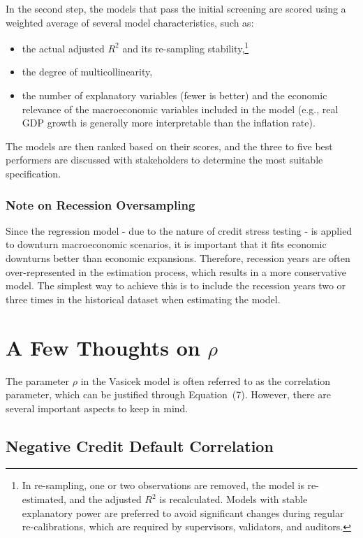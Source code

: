 \documentclass[11pt,a4paper]{article}
\begin{document}
In the second step, the models that pass the initial screening are scored using a weighted average of several model characteristics, such as:
\begin{itemize}
\item the actual adjusted $R^2$ and its re-sampling stability,\footnote{In re-sampling, one or two observations are removed, the model is re-estimated, and the adjusted $R^2$ is recalculated. Models with stable explanatory power are preferred to avoid significant changes during regular re-calibrations, which are required by supervisors, validators, and auditors.}
\item the degree of multicollinearity,
\item the number of explanatory variables (fewer is better) and the economic relevance of the macroeconomic variables included in the model (e.g., real GDP growth is generally more interpretable than the inflation rate).
\end{itemize}
The models are then ranked based on their scores, and the three to five best performers are discussed with stakeholders to determine the most suitable specification.

\subsubsection{Note on Recession Oversampling}

Since the regression model - due to the nature of credit stress testing - is applied to downturn macroeconomic scenarios, it is important that it fits economic downturns better than economic expansions. Therefore, recession years are often over-represented in the estimation process, which results in a more conservative model. The simplest way to achieve this is to include the recession years two or three times in the historical dataset when estimating the model.

\section{A Few Thoughts on $\rho$}

The parameter $\rho$ in the Vasicek model is often referred to as the correlation parameter, which can be justified through Equation~(7). However, there are several important aspects to keep in mind.

\subsection{Negative Credit Default Correlation}
\end{document}
